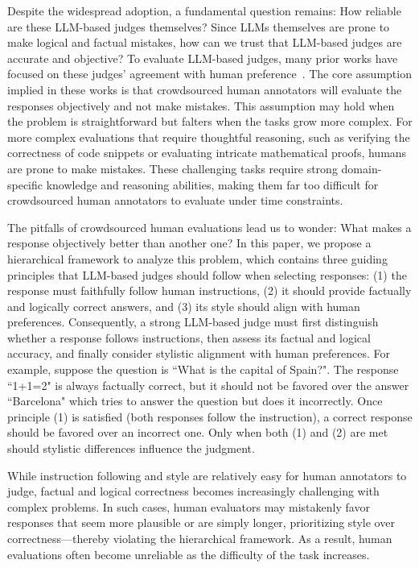 \documentclass{article} %
\begin{document}
Despite the widespread adoption, a fundamental question remains: How reliable are these LLM-based judges themselves? Since LLMs themselves are prone to make logical and factual mistakes, how can we trust that LLM-based judges are accurate and objective? To evaluate LLM-based judges, many prior works have focused on these judges' agreement with human preference~\citep{dubois2024alpacafarm, zheng2024judging, zhang2023llmeval2, wang2023faireval}. The core assumption implied in these works is that crowdsourced human annotators will evaluate the responses objectively and not make mistakes. This assumption may hold when the problem is straightforward but falters when the tasks grow more complex. For more complex evaluations that require thoughtful reasoning, such as verifying the correctness of code snippets or evaluating intricate mathematical proofs, humans are prone to make mistakes. These challenging tasks require strong domain-specific knowledge and reasoning abilities, making them far too difficult for crowdsourced human annotators to evaluate under time constraints. 

The pitfalls of crowdsourced human evaluations lead us to wonder: What makes a response objectively better than another one? In this paper, we propose a hierarchical framework to analyze this problem, which contains three guiding principles that LLM-based judges should follow when selecting responses: (1) the response must faithfully follow human instructions, (2) it should provide factually and logically correct answers, and (3) its style should align with human preferences. Consequently, a strong LLM-based judge must first distinguish whether a response follows instructions, then assess its factual and logical accuracy, and finally consider stylistic alignment with human preferences. For example, suppose the question is ``What is the capital of Spain?". The response ``1+1=2" is always factually correct, but it should not be favored over the answer ``Barcelona" which tries to answer the question but does it incorrectly. Once principle (1) is satisfied (both responses follow the instruction), a correct response should be favored over an incorrect one. Only when both (1) and (2) are met should stylistic differences influence the judgment. 

While instruction following and style are relatively easy for human annotators to judge, factual and logical correctness becomes increasingly challenging with complex problems. In such cases, human evaluators may mistakenly favor responses that seem more plausible or are simply longer, prioritizing style over correctness—thereby violating the hierarchical framework. As a result, human evaluations often become unreliable as the difficulty of the task increases.
\end{document}
